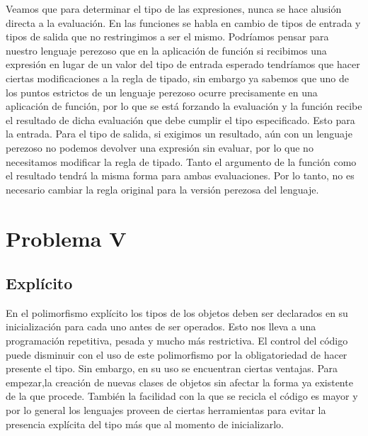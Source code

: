 \documentclass[12pt]{article}
\begin{document}
 Veamos que para determinar el tipo de las expresiones, nunca se hace alusión directa a la evaluación. En las funciones se habla en cambio de tipos de
 entrada y tipos de salida que no restringimos a ser el mismo. Podríamos pensar para nuestro lenguaje perezoso que en la aplicación de función
 si recibimos una expresión en lugar de un valor del tipo de entrada esperado tendríamos que hacer ciertas modificaciones a la regla de tipado,
 sin embargo ya sabemos que uno de los puntos estrictos de un lenguaje perezoso ocurre precisamente en una aplicación de función, por lo que se está forzando la evaluación y la función recibe el resultado de dicha evaluación que debe cumplir el tipo especificado. Esto para la entrada. Para el tipo de salida, si exigimos un resultado, aún con un lenguaje perezoso no podemos devolver una expresión sin evaluar, por lo que no
 necesitamos modificar la regla de tipado. Tanto el argumento de la función como el resultado tendrá la misma forma para ambas evaluaciones.
Por lo tanto, no es necesario cambiar la regla original para la versión perezosa del lenguaje. 
 
\section*{Problema V}
\subsection*{Explícito}
En el polimorfismo explícito los tipos de los objetos deben ser declarados en su inicialización para cada uno antes de ser operados.
Esto nos lleva a una programación repetitiva, pesada y mucho más restrictiva. El control del código puede disminuir con el uso de este
polimorfismo por la obligatoriedad de hacer presente el tipo. Sin embargo, en su uso se encuentran ciertas ventajas. Para empezar,la creación de nuevas clases de objetos sin afectar la forma ya existente de la que procede. También la facilidad con la que se recicla el código es mayor y por
lo general los lenguajes proveen de ciertas herramientas para evitar la presencia explícita del tipo más que al momento de inicializarlo.
\end{document}
